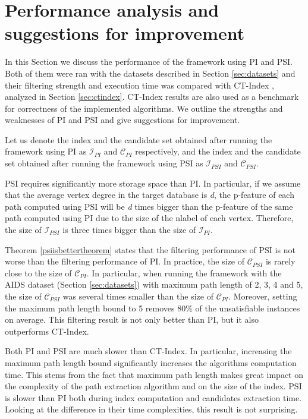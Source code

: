 \documentclass{l4proj}
\newcommand{\fancyI}{\mathcal{I}}
\newcommand{\fancyC}{\mathcal{C}}
\begin{document}
\section{Performance analysis and suggestions for improvement}
\label{sec:performance}
In this Section we discuss the performance of the framework using PI and PSI. Both of them were ran with the datasets described in Section \ref{sec:datasets} and their filtering strength and execution time was compared with CT-Index \cite{ctindex}, analyzed in Section \ref{sec:ctindex}. CT-Index results are also used as a benchmark for correctness of the implemented algorithms. We outline the strengths and weaknesses of PI and PSI and give suggestions for improvement.

Let us denote the index and the candidate set obtained after running the framework using PI as $\fancyI_{PI}$ and $\fancyC_{PI}$ respectively, and the index and the candidate set obtained after running the framework using PSI as $\fancyI_{PSI}$ and $\fancyC_{PSI}$. 

PSI requires significantly more storage space than PI. In particular, if we assume that the average vertex degree in the target database is \emph{d}, the p-feature of each path computed using PSI will be \emph{d} times bigger than the p-feature of the same path computed using PI due to the size of the nlabel of each vertex. Therefore, the size of $\fancyI_{PSI}$ is three times bigger than the size of $\fancyI_{PI}$.

Theorem \ref{psiisbettertheorem} states that the filtering performance of PSI is not worse than the filtering performance of PI. In practice, the size of $\fancyC_{PSI}$ is rarely close to the size of $\fancyC_{PI}$. In particular, when running the framework with the AIDS dataset (Section \ref{sec:datasets}) with maximum path length of 2, 3, 4 and 5, the size of $\fancyC_{PSI}$ was several times smaller than the size of $\fancyC_{PI}$. Moreover, setting the maximum path length bound to 5 removes 80\% of the unsatisfiable instances on average. This filtering result is not only better than PI, but it also outperforms CT-Index.

Both PI and PSI are much slower than CT-Index. In particular, increasing the maximum path length bound significantly increases the algorithms computation time. This stems from the fact that maximum path length makes great impact on the complexity of the path extraction algorithm and on the size of the index. PSI is slower than PI both during index computation and candidates extraction time. Looking at the difference in their time complexities, this result is not surprising.
\end{document}
